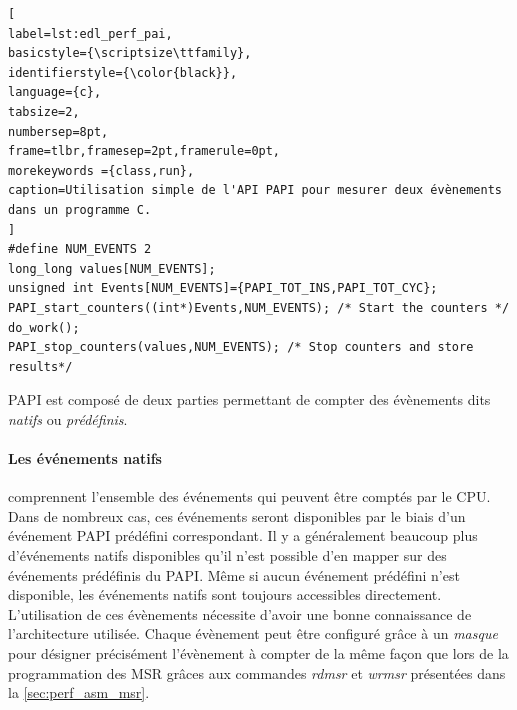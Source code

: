 \begin{lstlisting}[
label=lst:edl_perf_pai,
basicstyle={\scriptsize\ttfamily},
identifierstyle={\color{black}},
language={c},
tabsize=2,
numbersep=8pt,
frame=tlbr,framesep=2pt,framerule=0pt,
morekeywords ={class,run},
caption=Utilisation simple de l'API PAPI pour mesurer deux évènements dans un programme C.
]
#define NUM_EVENTS 2  
long_long values[NUM_EVENTS];
unsigned int Events[NUM_EVENTS]={PAPI_TOT_INS,PAPI_TOT_CYC};
PAPI_start_counters((int*)Events,NUM_EVENTS); /* Start the counters */
do_work();
PAPI_stop_counters(values,NUM_EVENTS); /* Stop counters and store results*/
\end{lstlisting}

    
    PAPI est composé de deux parties permettant de compter des évènements dits \textit{natifs} ou \textit{prédéfinis}. 
    
    \paragraph{Les événements \textbf{natifs}} comprennent l'ensemble des événements qui peuvent être comptés par le CPU. Dans de nombreux cas, ces événements seront disponibles par le biais d'un événement PAPI prédéfini correspondant. Il y a généralement beaucoup plus d'événements natifs disponibles qu'il n'est possible d'en mapper sur des événements prédéfinis du PAPI. Même si aucun événement prédéfini n'est disponible, les événements natifs sont toujours accessibles directement. L'utilisation de ces évènements nécessite d'avoir une bonne connaissance de l'architecture utilisée. Chaque évènement peut être configuré grâce à un \textit{masque} pour désigner précisément l'évènement à compter de la même façon que lors de la programmation des MSR grâces aux commandes \textit{rdmsr} et \textit{wrmsr} présentées dans la \autoref{sec:perf_asm_msr}. 
    
